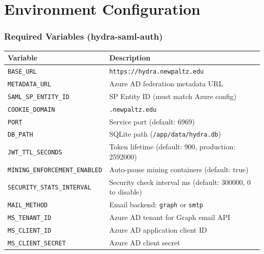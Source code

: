 \documentclass[11pt,a4paper]{article}
\begin{document}
\newpage
\part{Environment Configuration}

\section{Required Variables (hydra-saml-auth)}

\begin{table}[H]
\centering
\begin{tabular}{lp{7cm}}
\toprule
\textbf{Variable} & \textbf{Description} \\
\midrule
\texttt{BASE\_URL} & \texttt{https://hydra.newpaltz.edu} \\
\texttt{METADATA\_URL} & Azure AD federation metadata URL \\
\texttt{SAML\_SP\_ENTITY\_ID} & SP Entity ID (must match Azure config) \\
\texttt{COOKIE\_DOMAIN} & \texttt{.newpaltz.edu} \\
\texttt{PORT} & Service port (default: 6969) \\
\texttt{DB\_PATH} & SQLite path (\texttt{/app/data/hydra.db}) \\
\texttt{JWT\_TTL\_SECONDS} & Token lifetime (default: 900, production: 2592000) \\
\texttt{MINING\_ENFORCEMENT\_ENABLED} & Auto-pause mining containers (default: true) \\
\texttt{SECURITY\_STATS\_INTERVAL} & Security check interval ms (default: 300000, 0 to disable) \\
\texttt{MAIL\_METHOD} & Email backend: \texttt{graph} or \texttt{smtp} \\
\texttt{MS\_TENANT\_ID} & Azure AD tenant for Graph email API \\
\texttt{MS\_CLIENT\_ID} & Azure AD application client ID \\
\texttt{MS\_CLIENT\_SECRET} & Azure AD client secret \\
\bottomrule
\end{tabular}
\end{table}

\newpage
\appendix
\end{document}

